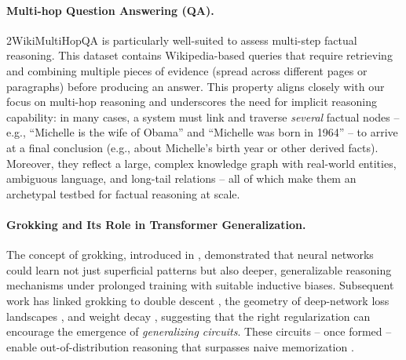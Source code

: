     \paragraph{Multi-hop Question Answering (QA).}
        2WikiMultiHopQA \citep{yang_hotpotqa_2018, ho_2WikiMultiHopQA_2020, trivedi_MuSiQue_2022} is particularly well-suited to assess multi-step factual reasoning. This dataset contains Wikipedia-based queries that require retrieving and combining multiple pieces of evidence (spread across different pages or paragraphs) before producing an answer. This property aligns closely with our focus on multi-hop reasoning and underscores the need for implicit reasoning capability: in many cases, a system must link and traverse \emph{several} factual nodes -- e.g., ``Michelle is the wife of Obama'' and ``Michelle was born in 1964'' -- to arrive at a final conclusion (e.g., about Michelle's birth year or other derived facts). Moreover, they reflect a large, complex knowledge graph with real-world entities, ambiguous language, and long-tail relations -- all of which make them an archetypal testbed for factual reasoning at scale.
    
    \paragraph{Grokking and Its Role in Transformer Generalization.}
        The concept of grokking, introduced in \citet{power2022grokking}, demonstrated that neural networks could learn not just superficial patterns but also deeper, generalizable reasoning mechanisms under prolonged training with suitable inductive biases. Subsequent work has linked grokking to double descent \citep{belkin2019reconciling, nakkiran2020deepdouble}, the geometry of deep-network loss landscapes \citep{davies2023unifying}, and weight decay \citep{pezeshki2022multiscale, nanda2023progress}, suggesting that the right regularization can encourage the emergence of \emph{generalizing circuits}. These circuits -- once formed -- enable out-of-distribution reasoning that surpasses naive memorization \citep{varma_circuit_efficiency_2023, liu2023omnigrok}.
    
